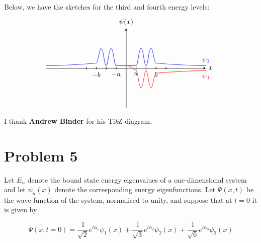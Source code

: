 \documentclass[10pt]{article}
\begin{document}
\begin{enumerate}[(a)]
        \begin{solution}
            Below, we have the sketches for the third and fourth energy levels:
            \[\begin{tikzpicture}
            \draw[thick, -stealth] (-4,0) -- (4,0) node[anchor=west] {$x$};
            \draw[thick, -stealth] (0,-2) -- (0,2) node[anchor=south] {$\psi(x)$};
            \draw[thick] (-0.5,0.0625) -- (-0.5,-0.0625) node[anchor=north] {$-a$};
            \draw[thick] (-1.5,0.0625) -- (-1.5,-0.0625) node[anchor=north] {$-b$};
            \draw[thick] (0.5,0.0625) -- (0.5,-0.0625) node[anchor=north] {$a$};
            \draw[thick] (1.5,0.0625) -- (1.5,-0.0625) node[anchor=north] {$b$};
            \draw[thick] (-1,0.0625) -- (-1,-0.0625);
            \draw[thick] (1,0.0625) -- (1,-0.0625);
            \draw[thick] (-2,0.0625) -- (-2,-0.0625);
            \draw[thick] (2,0.0625) -- (2,-0.0625);
            \draw[thick, blue!70] (-4,0.125) cos (-1.5,0.25) cos (-1.35,0.75) sin (-1.25,1) cos (-1.15,0.75) sin (-1,0.125) cos (-0.85,0.75) sin (-0.75,1) cos (-0.65,0.75) sin (-0.5,0.125) cos (0.5,0.125) cos (0.65,0.75) sin (0.75,1) cos (0.85,0.75) sin (1,0.125) cos (1.15,0.75) sin (1.25,1) cos (1.35,0.75) sin (1.5,0.25) sin (4,0.125) node[anchor=south] {$\psi_{3}$};
            \draw[thick, red!70] (0,0.125) cos (0.5,-0.125) cos (0.65,-0.75) sin (0.75,-1) cos (0.85,-0.75) sin (1,-0.125) cos (1.15,-0.75) sin (1.25,-1) cos (1.35,-0.75) sin (1.5,-0.25) sin (4,-0.125) node[anchor=north] {$\psi_{4}$};
            \end{tikzpicture}\]

            I thank \textbf{Andrew Binder} for his Ti\textit kZ diagram.
        \end{solution}
    \end{enumerate}


    \pagebreak

    \section*{Problem 5}
    Let $E_n$ denote the bound state energy eigenvalues of a one-dimensional system and let $\psi_n(x)$ denote the corresponding energy eigenfunctions. Let $\Psi(x, t)$ be the wave function of the system, normalised to unity, and suppose that at $t = 0$ it is given by

    \[ \Psi(x, t = 0) = \frac{1}{\sqrt{2}} e^{i\alpha_1}\psi_1(x) + \frac{1}{\sqrt{3}} e^{i\alpha_2} \psi_2(x) + \frac{1}{\sqrt{6}}e^{i\alpha_3}\psi_3(x)\]
\end{document}
